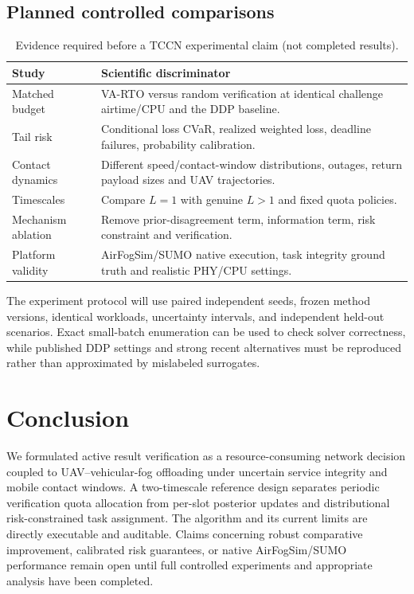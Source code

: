\documentclass[journal]{IEEEtran}
\begin{document}
\subsection{Planned controlled comparisons}
\begin{table}[t]
\caption{Evidence required before a TCCN experimental claim (not completed results).}
\label{tab:protocol}
\centering
\renewcommand{\arraystretch}{1.12}
\begin{tabular}{p{}p{}}
\toprule
Study & Scientific discriminator \\
\midrule
Matched budget & VA-RTO versus random verification at identical challenge airtime/CPU and the DDP baseline. \\
Tail risk & Conditional loss CVaR, realized weighted loss, deadline failures, probability calibration. \\
Contact dynamics & Different speed/contact-window distributions, outages, return payload sizes and UAV trajectories. \\
Timescales & Compare $L=1$ with genuine $L>1$ and fixed quota policies. \\
Mechanism ablation & Remove prior-disagreement term, information term, risk constraint and verification. \\
Platform validity & AirFogSim/SUMO native execution, task integrity ground truth and realistic PHY/CPU settings. \\
\bottomrule
\end{tabular}
\end{table}
The experiment protocol will use paired independent seeds, frozen method versions, identical workloads, uncertainty intervals, and independent held-out scenarios. Exact small-batch enumeration can be used to check solver correctness, while published DDP settings and strong recent alternatives must be reproduced rather than approximated by mislabeled surrogates.

\section{Conclusion}
We formulated active result verification as a resource-consuming network decision coupled to UAV--vehicular-fog offloading under uncertain service integrity and mobile contact windows. A two-timescale reference design separates periodic verification quota allocation from per-slot posterior updates and distributional risk-constrained task assignment. The algorithm and its current limits are directly executable and auditable. Claims concerning robust comparative improvement, calibrated risk guarantees, or native AirFogSim/SUMO performance remain open until full controlled experiments and appropriate analysis have been completed.
\end{document}
